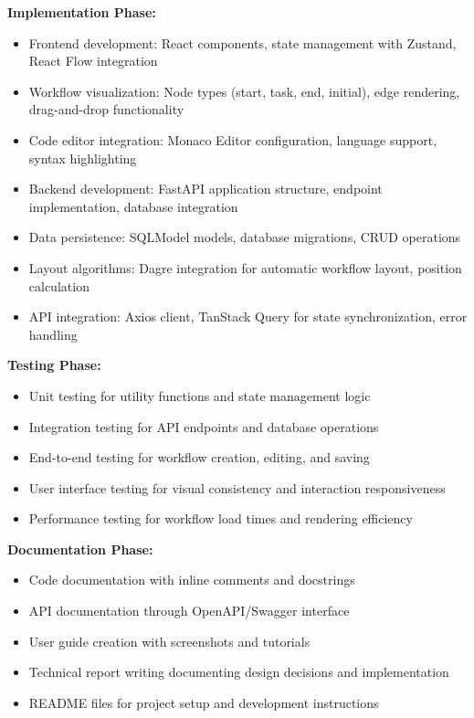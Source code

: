 \documentclass[12pt]{article}
\begin{document}
\textbf{Implementation Phase:}
\begin{itemize}
    \item Frontend development: React components, state management with Zustand, React Flow integration
    \item Workflow visualization: Node types (start, task, end, initial), edge rendering, drag-and-drop functionality
    \item Code editor integration: Monaco Editor configuration, language support, syntax highlighting
    \item Backend development: FastAPI application structure, endpoint implementation, database integration
    \item Data persistence: SQLModel models, database migrations, CRUD operations
    \item Layout algorithms: Dagre integration for automatic workflow layout, position calculation
    \item API integration: Axios client, TanStack Query for state synchronization, error handling
\end{itemize}

\textbf{Testing Phase:}
\begin{itemize}
    \item Unit testing for utility functions and state management logic
    \item Integration testing for API endpoints and database operations
    \item End-to-end testing for workflow creation, editing, and saving
    \item User interface testing for visual consistency and interaction responsiveness
    \item Performance testing for workflow load times and rendering efficiency
\end{itemize}

\textbf{Documentation Phase:}
\begin{itemize}
    \item Code documentation with inline comments and docstrings
    \item API documentation through OpenAPI/Swagger interface
    \item User guide creation with screenshots and tutorials
    \item Technical report writing documenting design decisions and implementation
    \item README files for project setup and development instructions
\end{itemize}
\end{document}
